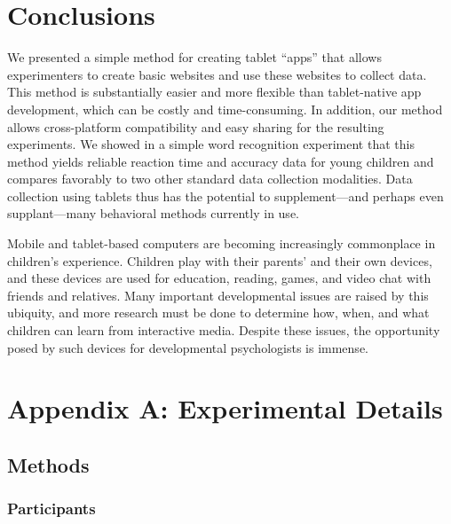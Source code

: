 \documentclass[man,noapacite]{apa2}
\begin{document}
\section{Conclusions} 

We presented a simple method for creating tablet ``apps'' that allows experimenters to create basic websites and use these websites to collect data. This method is substantially easier and more flexible than tablet-native app development, which can be costly and time-consuming. In addition, our method allows cross-platform compatibility and easy sharing for the resulting experiments. We showed in a simple word recognition experiment that this method yields reliable reaction time and accuracy data for young children and compares favorably to two other standard data collection modalities. Data collection using tablets thus has the potential to supplement---and perhaps even supplant---many behavioral methods currently in use. 

Mobile and tablet-based computers are becoming increasingly commonplace in children's experience. Children play with their parents' and their own devices, and these devices are used for education, reading, games, and video chat with friends and relatives. Many important developmental issues are raised by this ubiquity, and more research must be done to determine how, when, and what children can learn from interactive media. Despite these issues, the opportunity posed by such devices for developmental psychologists is immense.





\newpage

\theappendix

\section{Appendix A: Experimental Details}

\subsection{Methods}

\subsubsection{Participants}                                                                                                                              

\end{document}
